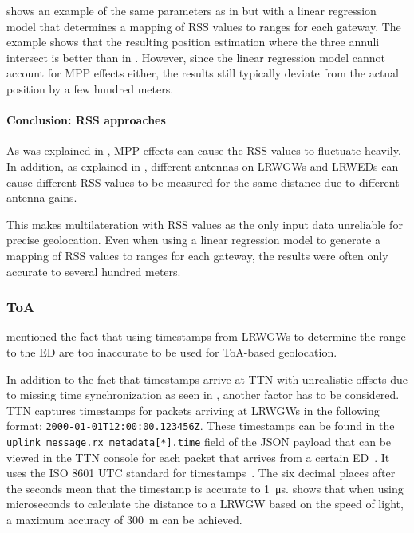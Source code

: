  shows an example of the same parameters as in  but with a linear regression model that determines a mapping of \ac{RSS} values to ranges for each gateway.
The example shows that the resulting position estimation where the three annuli intersect is better than in .
However, since the linear regression model cannot account for \ac{MPP} effects either, the results still typically deviate from the actual position by a few hundred meters.

\paragraph{Conclusion: \acl{RSS} approaches}

As was explained in , \acl{MPP} effects can cause the \ac{RSS} values to fluctuate heavily.
In addition, as explained in , different antennas on \aclp{LRWGW} and \aclp{LRWED} can cause different \ac{RSS} values to be measured for the same distance due to different antenna gains.

This makes multilateration with \ac{RSS} values as the only input data unreliable for precise geolocation.
Even when using a linear regression model to generate a mapping of \ac{RSS} values to ranges for each gateway, the results were often only accurate to several hundred meters.

\subsubsection{\acl{ToA}}\label{subsec:conclusion-toa-tdoa}

 mentioned the fact that using timestamps from \aclp{LRWGW} to determine the range to the \acl{ED} are too inaccurate to be used for \ac{ToA}-based geolocation.

In addition to the fact that timestamps arrive at \ac{TTN} with unrealistic offsets due to missing time synchronization as seen in , another factor has to be considered.
\ac{TTN} captures timestamps for packets arriving at \aclp{LRWGW} in the following format: \lstinline|2000-01-01T12:00:00.123456Z|.
These timestamps can be found in the \lstinline|uplink_message.rx_metadata[*].time| field of the \ac{JSON} payload that can be viewed in the \ac{TTN} console for each packet that arrives from a certain \acl{ED}~\cite{the_things_industries_bv_data_2023}.
It uses the \ac{ISO} 8601 \ac{UTC} standard for timestamps~\cite{newman_date_2002}.
The six decimal places after the seconds mean that the timestamp is accurate to \SI{1}{\micro\second}.
 shows that when using microseconds to calculate the distance to a \acl{LRWGW} based on the speed of light, a maximum accuracy of \SI{300}{\meter} can be achieved.

